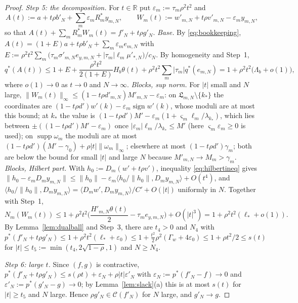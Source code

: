 \documentclass[10pt]{amsart}
\theoremstyle{definition}
\theoremstyle{remark}
\newcommand{\supp}{\operatorname{supp}}
\newcommand{\sgn}{\operatorname{sign}}
\newcommand{\R}{\mathbb R}
\newcommand{\Cset}{\mathcal C}
\newcommand{\ip}[2]{\langle #1,#2\rangle}
\begin{document}
\begin{proof}
\emph{Step 5: the decomposition.}  For $t\in\R$ put
$\varepsilon_m:=\tau_m\rho^2t^2$ and
\[
 A(t):=a+t\rho b'_N+\sum_m\varepsilon_mR_m^*y_{m,N},\qquad
 W_m(t):=w'_{m,N}+t\rho v'_{m,N}-\varepsilon_my_{m,N},
\]
so that $A(t)+\sum_mR_m^*W_m(t)=f'_N+t\rho g'_N$.
\emph{Base.}  By \eqref{eq:bookkeeping},
$A(t)=(1+E)a+t\rho b'_N+\sum_m\varepsilon_me_{m,N}$ with
$E:=\rho^2t^2\sum_m\big(\tau_m\sigma'_{m,N}e_{y,m,N}+|\tau_m|\ell_m
\mu'_{*,N}\big)/c_N$.  By homogeneity and Step~1,
\[
 q^*(A(t))\le1+E+\frac{\rho^2t^2}{2(1+E)}H_b\theta(t)
 +\rho^2t^2\sum_m|\tau_m|q^*(e_{m,N})
 =1+\rho^2t^2\big(\Lambda_b+o(1)\big),
\]
where $o(1)\to0$ as $t\to0$ and $N\to\infty$.
\emph{Blocks, sup norm.}  For $|t|$ small and $N$ large,
$\|W_m(t)\|_\infty\le(1-t\rho d'_{m,N})M'_{m,N}-\varepsilon_m$: on
$\mathfrak L_{m,N}\setminus\{k_*\}$ the coordinates are
$(1-t\rho d')w'(k)-\varepsilon_m\sgn w'(k)$, whose moduli are at most this
bound; at $k_*$ the value is $(1-t\rho d')M'-\varepsilon_m(1+\varsigma_m
\ell_m/\lambda_{k_*})$, which lies between $\pm((1-t\rho
d')M'-\varepsilon_m)$ once $|\varepsilon_m|\ell_m/\lambda_{k_*}\le M'$ (here
$\varsigma_m\varepsilon_m\ge0$ is used); on $\supp\omega_m$ the moduli are at
most $(1-t\rho d')(M'-\gamma_0)+\rho|t|\|\omega_m\|_\infty$; elsewhere at
most $(1-t\rho d')\gamma_m$; both are below the bound for small $|t|$ and
large $N$ because $M'_{m,N}\to M_m>\gamma_m$.
\emph{Blocks, Hilbert part.}  With $h_0:=D_m(w'+t\rho v')$, inequality
\eqref{eq:hilbertineq} gives
$\|h_0-\varepsilon_mD_my_{m,N}\|\le\|h_0\|-\varepsilon_m\ip{h_0/\|h_0\|}{D_m
y_{m,N}}+O(t^4)$, and $\ip{h_0/\|h_0\|}{D_my_{m,N}}=
\ip{D_mw'}{D_my_{m,N}}/C'+O(|t|)$ uniformly in $N$.  Together with Step~1,
\[
 N_m(W_m(t))\le1+\rho^2t^2\Big(\frac{H'_{m,N}\theta(t)}2-\tau_me_{y,m,N}
 \Big)+O(|t|^3)=1+\rho^2t^2(\ell_*+o(1)).
\]
By Lemma~\ref{lem:dualball} and Step~3, there are $t_4>0$ and $N_4$ with
$p^*(f'_N+t\rho g'_N)\le1+\rho^2t^2(\ell_*+\varepsilon_0)\le1+\frac{t^2}2\rho^2
(\Gamma_w+4\varepsilon_0)\le1+\rho t^2/2\le s(t)$ for $|t|\le t_5:=\min(t_4,
2\sqrt{1-\rho},1)$ and $N\ge N_4$.

\emph{Step 6: large $t$.}  Since $(f,g)$ is contractive,
$p^*(f'_N+t\rho g'_N)\le s(\rho t)+\varepsilon_N+\rho|t|\varepsilon'_N$ with
$\varepsilon_N:=p^*(f'_N-f)\to0$ and $\varepsilon'_N:=p^*(g'_N-g)\to0$; by
Lemma~\ref{lem:slack}(a) this is at most $s(t)$ for $|t|\ge t_5$ and $N$
large.  Hence $\rho g'_N\in\Cset(f'_N)$ for $N$ large, and $g'_N\to g$.
\end{proof}
\end{document}
